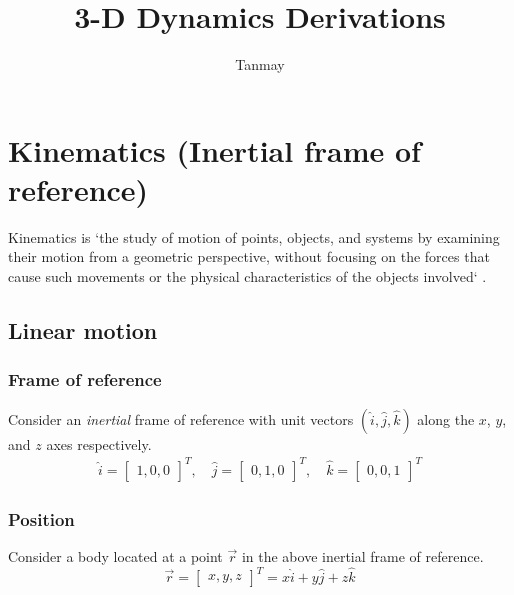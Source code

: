 \documentclass[a4paper,12pt]{article}
\title{3-D Dynamics Derivations}
\author{Tanmay}
\begin{document}
\maketitle

\section{Kinematics (Inertial frame of reference)}
Kinematics is `the study of motion of points, objects, and systems by examining their motion from a geometric perspective, without focusing on the forces that cause such movements or the physical characteristics of the objects involved` \cite{geeks_kinematics}.


\subsection{Linear motion}
\subsubsection{Frame of reference}
Consider an \textit{inertial} frame of reference with unit vectors \((\hat{i}, \hat{j}, \hat{k})\) along the \(x\), \(y\), and \(z\) axes respectively. \\
\begin{equation} \nonumber
    \begin{aligned}
        \hat{i} = \begin{bmatrix}
            1,0,0
        \end{bmatrix}^T, \quad
        \hat{j} = \begin{bmatrix}
            0,1,0
        \end{bmatrix}^T, \quad
        \hat{k} = \begin{bmatrix}
            0,0,1
        \end{bmatrix}^T
    \end{aligned}
\end{equation}

\subsubsection{Position}
Consider a body located at a point \(\vec{r}\) in the above inertial frame of reference.
\begin{equation} \nonumber
    \vec{r} =
    \begin{bmatrix}
        x, y, z
    \end{bmatrix}^T
    = x \hat{i} + y \hat{j} + z \hat{k}
\end{equation}
\end{document}
